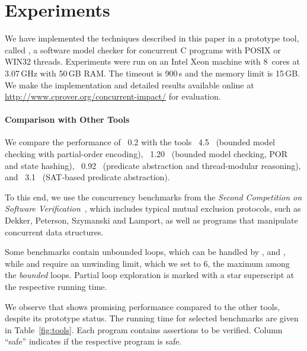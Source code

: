 \documentclass[conference]{IEEEtran}
\begin{document}
%
% 



\section{Experiments}
\label{sec:experiments}

We have implemented the techniques described in this paper in a
prototype tool, called , 
a software model checker for concurrent C programs with POSIX or WIN32 threads. 
Experiments were run on an Intel Xeon machine with 8~cores at 3.07\,GHz with 50\,GB
RAM.  The timeout is 900\,s and the memory limit is 15\,GB.  We make the
implementation and detailed results available online at
\mbox{{{\sf\small\url{http://www.cprover.org/concurrent-impact/}}}} for evaluation.

\paragraph*{Comparison with Other Tools}

We compare the performance of ~0.2 with the tools 
~4.5~\cite{DBLP:conf/cav/AlglaveKT13}
(bounded model checking with partial-order encoding),
~1.20~\cite{DBLP:conf/icse/CordeiroF11}
(bounded model checking, POR and state hashing),
~0.92~\cite{gpr11}
(predicate abstraction and thread-modular reasoning), 
and ~3.1~\cite{cksy2004} (SAT-based predicate abstraction).

To this end, we use the concurrency benchmarks from the 
\emph{Second Competition on Software Verification}~\cite{DBLP:conf/tacas/Beyer13},
which includes typical mutual exclusion protocols, such
as Dekker, Peterson, Szymanski and Lamport, as well as programs that
manipulate concurrent data structures. 

Some benchmarks contain unbounded loops, which 
can be handled by , 
and ,
while  and  
require an unwinding limit, which we set to 6, the maximum among the \emph{bounded} loops.
Partial loop exploration is marked with a star superscript at the respective running time.

We observe that  shows promising performance compared to the
other tools, despite its prototype status.  The running time for selected
benchmarks are given in Table~\ref{fig:tools}.
Each program contains assertions to be verified.
Column ``safe'' indicates if the respective program is safe.
\end{document}
